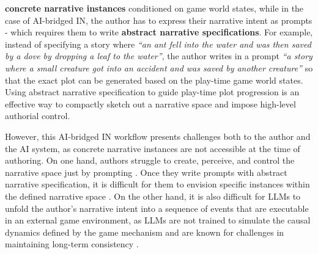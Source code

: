  {\textbf{concrete narrative instances} conditioned on game world states, while in the case of AI-bridged IN, the author has to express their narrative intent as prompts - which requires them to write \textbf{abstract narrative specifications}.  For example, instead of specifying a story where \textit{``an ant fell into the water and was then saved by a dove by dropping a leaf to the water''}, the author writes in a prompt \textit{``a story where a small creature got into an accident and was saved by another creature''} so that the exact plot can be generated based on the play-time game world states.
Using abstract narrative specification to guide play-time plot progression is an effective way to compactly sketch out a narrative space and impose high-level authorial control.

However, this AI-bridged IN workflow presents challenges both to the author and the AI system, as concrete narrative instances are not accessible at the time of authoring. On one hand, authors struggle to create, perceive, and control the narrative space just by prompting \cite{kreminski2024intent}. Once they write prompts with abstract narrative specification, it is difficult for them to envision specific instances within the defined narrative space \cite{kim2024authors}. On the other hand, it is also difficult for LLMs to unfold the author's narrative intent into a sequence of events that are executable in an external game environment, as LLMs are not trained to simulate the causal dynamics defined by the game mechanism and are known for challenges in maintaining long-term consistency \cite{mirowski2023co}.


}
